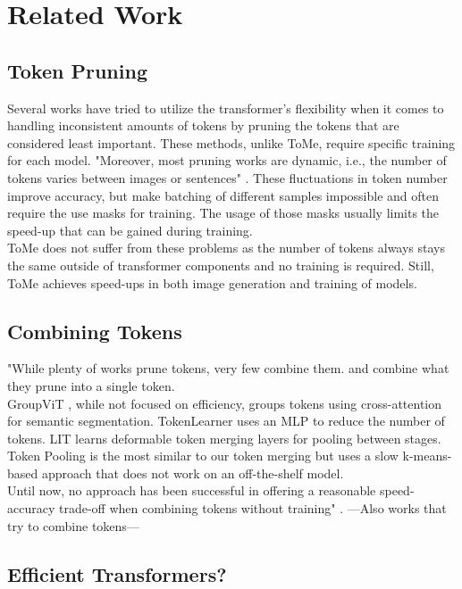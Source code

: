 \section{Related Work}


\subsection*{Token Pruning}
Several works have tried to utilize the transformer's flexibility when it comes to handling inconsistent amounts of tokens by pruning the tokens that are considered least important. These methods, unlike ToMe, require specific training for each model. "Moreover, most
pruning works are dynamic, i.e., the number of tokens varies between images or sentences" \cite{bolya2023tome}. These fluctuations in token number improve accuracy, but make batching of different samples impossible and often require the use masks for training. The usage of those masks usually limits the speed-up that can be gained during training.\\
ToMe does not suffer from these problems as the number of tokens always stays the same outside of transformer components and no training is required. Still, ToMe achieves speed-ups in both image generation and training of models.



\subsection*{Combining Tokens}
"While plenty of works prune tokens, very few combine them. \cite{kong2021spvit} and \cite{liang2022not} combine what they prune into a single token.\\ 
GroupViT \cite{xu2022groupvit}, while not focused on efficiency, groups tokens using cross-attention for semantic segmentation.
TokenLearner \cite{ryoo2021tokenlearner} uses an MLP to reduce the number of tokens.
LIT \cite{pan2022less} learns deformable token merging layers for pooling between stages.\\
Token Pooling \cite{marin2021token} is the most similar to our token merging but uses a slow k-means-based approach that does not work on an off-the-shelf model.\\
Until now, no approach has been successful in offering a reasonable speed-accuracy trade-off when combining tokens without training" \cite{bolya2023tome}.
---Also works that try to combine tokens---


\subsection*{Efficient Transformers?}